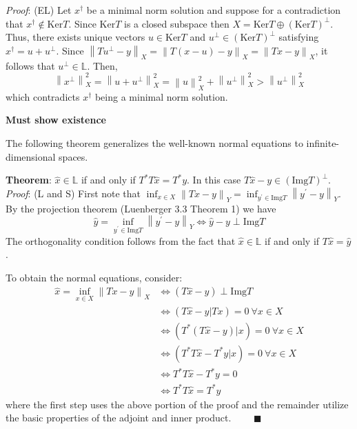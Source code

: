 \documentclass[12pt]{amsart}
\newcommand*{\norm}[1]{\left\lVert#1\right\rVert}
\newcommand{\Img}{\mathrm{Img}}
\newcommand{\Ker}{\mathrm{Ker}}
\begin{document}
 \textit{Proof}: (EL) Let $x^\dagger$ be a minimal norm solution and suppose for a contradiction that $x^\dagger \notin \Ker T$. Since $\Ker T$ is a closed subspace then $X = \Ker T \oplus (\Ker T)^\perp$. Thus, there exists unique vectors $u \in \Ker T$ and $u^\perp \in (\Ker T)^\perp$ satisfying $x^\dagger = u + u^\perp$. Since $\norm{Tu^\perp - y}_X = \norm{T(x - u) - y}_X = \norm{Tx - y}_X$, it follows that $u^\perp \in \mathbb{L}$. Then, \[\norm{x^\perp}_{X}^{2} = \norm{u + u^\perp}_{X}^{2} = \norm{u}_{X}^{2} + \norm{u^\perp}_{X}^{2} > \norm{u^\perp}_{X}^{2}\]
 which contradicts $x^\dagger$ being a minimal norm solution. 
 
 \smallskip 
 
\textbf{Must show existence} 

\medskip

The following theorem generalizes the well-known normal equations to infinite-dimensional spaces. 

\textbf{Theorem}: $\hat{x} \in \mathbb{L}$ if and only if $T^* T\hat{x} = T^* y$. In this case $T\hat{x} - y \in (\Img T)^\perp$. \\[.1cm] 

\textit{Proof}: (L and S) First note that $\inf_{x \in X} \norm{Tx - y}_Y = \inf_{y^\prime \in \Img T} \norm{y^\prime - y}_Y$. By the projection theorem (Luenberger 3.3 Theorem 1) we have \[\hat{y} = \inf_{y^\prime \in \Img T} \norm{y^\prime - y}_Y \iff \hat{y} - y \perp \Img T\] 
The orthogonality condition follows from the fact that $\hat{x} \in \mathbb{L}$ if and only if $T\hat{x} = \hat{y}$. 

\smallskip

To obtain the normal equations, consider: 
\begin{align*} 
\hat{x} = \inf_{x \in X} \norm{Tx - y}_X &\iff (T\hat{x} - y) \perp \Img T \\
                                                            &\iff (T\hat{x} - y| Tx) = 0 \ \forall x \in X \\
                                                            &\iff (T^*(T\hat{x} - y)| x) = 0 \ \forall x \in X \\
                                                            &\iff (T^*T\hat{x} - T^*y| x) = 0 \ \forall x \in X \\
                                                            &\iff T^*T\hat{x} - T^*y = 0 \\
                                                            &\iff T^*T\hat{x} = T^*y                                                            
\end{align*} 
where the first step uses the above portion of the proof and the remainder utilize the basic properties of the adjoint and inner product. $\qquad \blacksquare$
 
 
\end{document}
